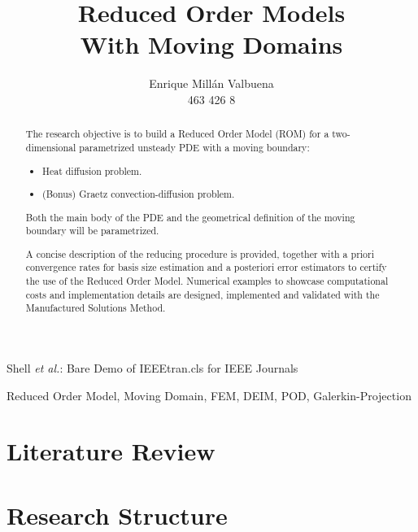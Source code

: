 \documentclass[a4paper, technote, compsoc]{IEEEtran}
\begin{document}
\title{Reduced Order Models \\ With Moving Domains}

\author{Enrique Millán Valbuena \\ \normalsize{463 426 8}}%
        
{Shell \MakeLowercase{\textit{et al.}}: Bare Demo of IEEEtran.cls for IEEE Journals}

\maketitle

\begin{abstract}
   The research objective is to build a Reduced Order Model (ROM) for a two-dimensional parametrized unsteady PDE with a moving boundary:
   \begin{itemize}
      \item Heat diffusion problem.
      \item (Bonus) Graetz convection-diffusion problem.
   \end{itemize}
   Both the main body of the PDE and the geometrical definition of the moving boundary will be parametrized.

   A concise description of the reducing procedure is provided, together with a priori convergence rates for basis size estimation and a posteriori error estimators to certify the use of the Reduced Order Model.
   Numerical examples to showcase computational costs and implementation details are designed, implemented and validated with the Manufactured Solutions Method. 
\end{abstract}

\begin{IEEEkeywords}
    Reduced Order Model, Moving Domain, FEM, DEIM, POD, Galerkin-Projection
\end{IEEEkeywords}
    

\section*{Literature Review}


\newpage
\section*{Research Structure}

\end{document}
